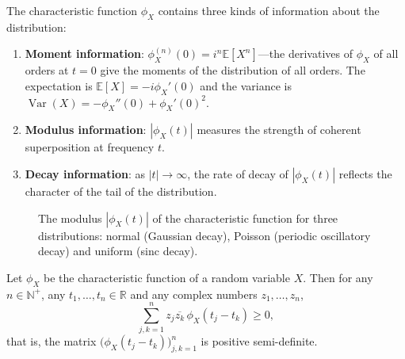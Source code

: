 \begin{remark}\label{prop:characteristic_grammar}
The characteristic function $\phi_X$ contains three kinds of information about the distribution:
\begin{enumerate}[label=(\roman*)]
    \item \textbf{Moment information}: $\phi_X^{(n)}(0) = i^n \mathbb{E}[X^n]$---the derivatives of $\phi_X$ of all orders at $t = 0$ give the moments of the distribution of all orders. The expectation is $\mathbb{E}[X] = -i\phi_X'(0)$ and the variance is $\operatorname{Var}(X) = -\phi_X''(0) + \phi_X'(0)^2$.
    \item \textbf{Modulus information}: $|\phi_X(t)|$ measures the strength of coherent superposition at frequency $t$.
    \item \textbf{Decay information}: as $|t| \to \infty$, the rate of decay of $|\phi_X(t)|$ reflects the character of the tail of the distribution.
\end{enumerate}
\end{remark}

\begin{figure}[htbp]
\centering
{}
\caption{The modulus $|\phi_X(t)|$ of the characteristic function for three distributions: normal (Gaussian decay), Poisson (periodic oscillatory decay) and uniform (sinc decay).}
\label{fig:characteristic_functions}
\end{figure}

\begin{lemma}\label{ch14_characteristic_pd}
Let $\phi_X$ be the characteristic function of a random variable $X$. Then for any $n \in \mathbb{N}^+$, any $t_1, \dots, t_n \in \mathbb{R}$ and any complex numbers $z_1, \dots, z_n$,
\[
\sum_{j,k=1}^{n} z_j \overline{z_k}\, \phi_X(t_j - t_k) \ge 0,
\]
that is, the matrix $\bigl( \phi_X(t_j - t_k) \bigr)_{j,k=1}^{n}$ is positive semi-definite.
\end{lemma}

